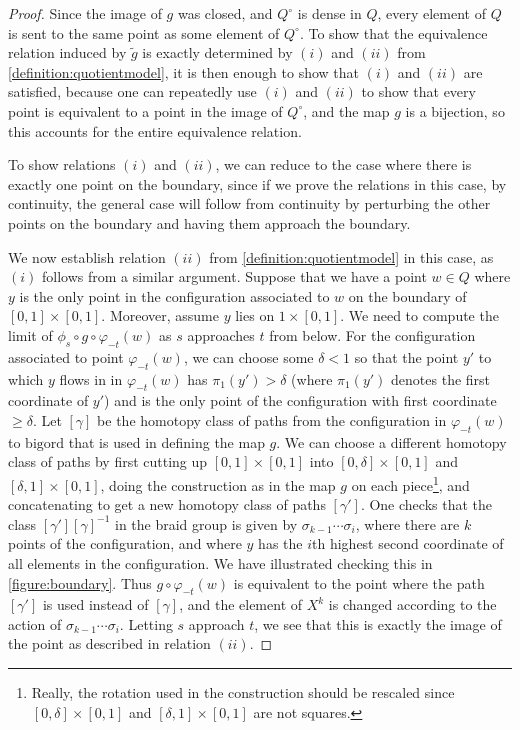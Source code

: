 \documentclass[12 pt]{amsart}
\theoremstyle{plain}
\theoremstyle{definition}
\theoremstyle{remark}
\numberwithin{equation}{section}
\begin{document}
\begin{proof}
	Since the image of $g$ was closed, and $Q^\circ$ is dense in $Q$, every
	element of $Q$ is sent to the same point as some element of $Q^\circ$.
	To show that the equivalence relation induced by $\tilde{g}$ is exactly
	determined by $(i)$ and $(ii)$ from \autoref{definition:quotientmodel}, 
	it is then enough to show that $(i)$ and
	$(ii)$ are satisfied, because one can repeatedly use $(i)$ and $(ii)$ to
	show that every point is equivalent to a point in the image of $Q^\circ$, and the map $g$ is a bijection, so this accounts for the entire equivalence relation.
	
	To show relations $(i)$ and $(ii)$, we can reduce to the case where there is exactly one point on the boundary, since if we prove the relations in this case, by continuity, the general case will follow from continuity by perturbing the other points on the boundary and having them approach the boundary.
	
	We now establish relation $(ii)$ from
	\autoref{definition:quotientmodel}
	in this case, as $(i)$ follows from a
	similar argument. Suppose that we have a point $w \in Q$ where $y$ is
	the only point in the configuration associated to $w$ on the boundary of
	$[0,1] \times [0,1]$. Moreover, assume $y$ lies on $1\times [0,1]$. We
	need to compute the limit of $\phi_s\circ g\circ \varphi_{-t}(w)$ as $s$
	approaches $t$ from below. For the configuration associated to point
	$\varphi_{-t}(w)$, we can choose some $\delta<1$ so that the point
	$y'$ to which $y$ flows in
	in $\varphi_{-t}(w)$ has $\pi_1(y') >\delta$ (where
	$\pi_1(y')$ denotes the first coordinate of $y'$) and is the only point of the
	configuration with first 
	coordinate $\geq \delta$. Let $[\gamma]$ be
	the homotopy class of paths from the configuration in $\varphi_{-t}(w)$ to
	$\mathrm{bigord}$ that is used in defining the map $g$. We can choose a
	different homotopy class of paths by first cutting up $[0,1]\times
	[0,1]$ into $[0,\delta]\times [0,1]$ and $[\delta,1]\times[0,1]$, doing
	the construction as in the map $g$ on each piece\footnote{Really, the rotation used in the construction should be rescaled since $[0,\delta]\times [0,1]$ and $[\delta,1]\times [0,1]$ are not squares.}, 
	and concatenating to
	get a new homotopy class of paths $[\gamma']$. One
	checks that
	the class $[\gamma'][\gamma]^{-1}$ in the braid group is given by
	$\sigma_{k-1}\cdots\sigma_i$, where there are $k$ points of the configuration, and
	where $y$ has the $i$th highest second
	coordinate of all elements in the configuration. We have illustrated checking this in \autoref{figure:boundary}.	Thus $g\circ
	\varphi_{-t}(w)$ is equivalent to the point where the path $[\gamma']$ is
	used instead of $[\gamma]$, and the element of $X^k$ is changed
	according to the action of $\sigma_{k-1}\cdots\sigma_i$. Letting $s$ approach $t$, we see that this is exactly the image of the point as described in relation $(ii)$.
	

\end{proof}
\end{document}
